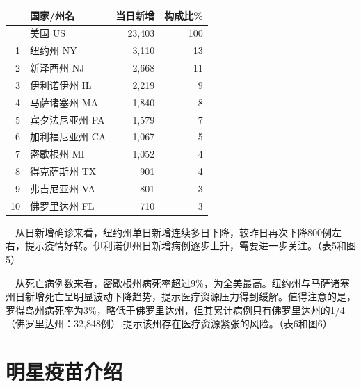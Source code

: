 \documentclass[]{article}
\begin{document}
\begin{table}[H]
\begin{minipage}{.7\linewidth}
\begin{table}[H]
\begin{tabular}{rlrr}
\toprule
  & 国家/州名 & 当日新增 & 构成比\%\\
\midrule
\rowcolor{gray!6}   & 美国 US & 23,403 & 100\\
1 & 纽约州 NY & 3,110 & 13\\
\rowcolor{gray!6}  2 & 新泽西州 NJ & 2,668 & 11\\
3 & 伊利诺伊州 IL & 2,219 & 9\\
\rowcolor{gray!6}  4 & 马萨诸塞州 MA & 1,840 & 8\\
5 & 宾夕法尼亚州 PA & 1,579 & 7\\
\rowcolor{gray!6}  6 & 加利福尼亚州 CA & 1,067 & 5\\
7 & 密歇根州 MI & 1,052 & 4\\
\rowcolor{gray!6}  8 & 得克萨斯州 TX & 901 & 4\\
9 & 弗吉尼亚州 VA & 801 & 3\\
\rowcolor{gray!6}  10 & 佛罗里达州 FL & 710 & 3\\
\bottomrule
\end{tabular}
\endgroup{}
\end{table} \end{minipage} 
\end{table}

\(\quad\)从日新增确诊来看，纽约州单日新增连续多日下降，较昨日再次下降800例左右，提示疫情好转。伊利诺伊州日新增病例逐步上升，需要进一步关注。（表5和图5）

\(\quad\)从死亡病例数来看，密歇根州病死率超过9\%，为全美最高。纽约州与马萨诸塞州日新增死亡呈明显波动下降趋势，提示医疗资源压力得到缓解。值得注意的是，罗得岛州病死率为3\%，略低于佛罗里达州，但其累计病例只有佛罗里达州的1/4（佛罗里达州：32,848例）,提示该州存在医疗资源紧张的风险。（表6和图6）

\vspace{5mm}

%
  \noindent{}%

\vspace{-5mm}

\hypertarget{section-4}{%
\section{\texorpdfstring{\textcolor{glaucous}{\Huge 明星疫苗介绍}}{}}\label{section-4}}

\vspace{-3mm}
\end{document}
